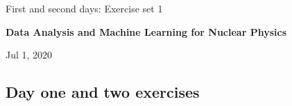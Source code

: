 \documentclass[%
oneside,                 %
final,                   %
10pt]{article}
\begin{document}

\newcommand{\exercisesection}[1]{\subsection*{#1}}






\thispagestyle{empty}

\begin{center}
{\LARGE\bf
\begin{spacing}{1.25}
First and second days: Exercise set 1
\end{spacing}
}
\end{center}


\begin{center}
{\bf Data Analysis and Machine Learning for Nuclear Physics${}^{}$} \\ [0mm]
\end{center}

\begin{center}
\end{center}
    

\begin{center}
Jul 1, 2020
\end{center}

\vspace{1cm}


\subsection*{Day one and two  exercises}
\end{document}
